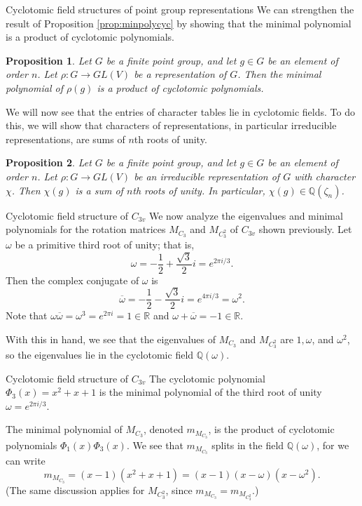 \documentclass{beamer}
\newcommand{\vs}{\vspace{5mm}}
\newtheorem{proposition}{Proposition}
\begin{document}
    \begin{frame}{Cyclotomic field structures of point group representations}
        We can strengthen the result of Proposition \ref{prop:minpolycyc} by showing that the minimal polynomial is a product of cyclotomic polynomials.

        \begin{proposition}
            Let $G$ be a finite point group, and let $g\in G$ be an element of order $n$. Let $\rho:G\to GL(V)$ be a representation of $G$. Then the minimal polynomial of $\rho(g)$ is a product of cyclotomic polynomials.
            \label{prop:minpolycycpoly}
        \end{proposition}

        {
            We will now see that the entries of character tables lie in cyclotomic fields. To do this, we will show that characters of representations, in particular irreducible representations, are sums of $n$th roots of unity.

            \begin{proposition}
                Let $G$ be a finite point group, and let $g\in G$ be an element of order $n$. Let $\rho : G\to GL(V)$ be an irreducible representation of $G$ with character $\chi$. Then $\chi(g)$ is a sum of $n$th roots of unity. In particular, $\chi(g)\in\mathbb{Q}(\zeta_n)$.
            \label{prop:charcyc}
            \end{proposition}
        }
    \end{frame}
    
    \begin{frame}{Cyclotomic field structure of $C_{3v}$}
        We now analyze the eigenvalues and minimal polynomials for the rotation matrices $M_{C_3}$ and $M_{C_3^2}$ of $C_{3v}$ shown previously. Let $\omega$ be a primitive third root of unity; that is,
        \[\omega=-\dfrac{1}{2}+\frac{\sqrt{3}}{2}i=e^{2\pi i/3}.\]
        Then the complex conjugate of $\omega$ is \[\overline\omega=-\dfrac{1}{2}-\frac{\sqrt{3}}{2}i=e^{4\pi i/3}=\omega^2.\]
        Note that $\omega\overline\omega = \omega^3 = e^{2\pi i}=1\in\mathbb{R}$ and $\omega+\overline\omega = -1\in\mathbb{R}$.
        \vs
    
        With this in hand, we see that the eigenvalues of $M_{C_3}$ and $M_{C_3^2}$ are $1,\omega$, and $\omega^2$, so the eigenvalues lie in the cyclotomic field $\mathbb{Q}(\omega)$.\vs
    \end{frame}

    \begin{frame}{Cyclotomic field structure of $C_{3v}$}
        The cyclotomic polynomial $\Phi_3(x)=x^2+x+1$ is the minimal polynomial of the third root of unity $\omega=e^{2\pi i/3}$.
        \vs
    
        The minimal polynomial of $M_{C_3}$, denoted $m_{M_{C_3}}$, is the product of cyclotomic polynomials $\Phi_1(x)\Phi_3(x)$. We see that $m_{M_{C_3}}$ splits in the field $\mathbb{Q}(\omega)$, for we can write \[m_{M_{C_3}}=(x-1)(x^2+x+1)=(x-1)(x-\omega)(x-\omega^2).\] (The same discussion applies for $M_{C_3^2}$, since $m_{M_{C_3}}=m_{M_{C_3^2}}$.)
    \end{frame}
    
\end{document}

